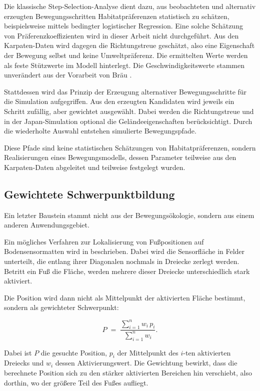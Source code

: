 \documentclass[12pt,a4paper]{report}
\begin{document}
Die klassische Step-Selection-Analyse dient dazu, aus
beobachteten und alternativ erzeugten Bewegungsschritten
Habitatpräferenzen statistisch zu schätzen, beispielsweise
mittels bedingter logistischer Regression. Eine solche
Schätzung von Präferenzkoeffizienten wird in dieser Arbeit
nicht durchgeführt. Aus den Karpaten-Daten wird dagegen die
Richtungstreue geschätzt, also eine Eigenschaft der Bewegung
selbst und keine Umweltpräferenz. Die ermittelten Werte
werden als feste Stützwerte im Modell hinterlegt. Die
Geschwindigkeitswerte stammen unverändert aus der Vorarbeit
von Bräu \cite{BreuBA}.

Stattdessen wird das Prinzip der Erzeugung alternativer
Bewegungsschritte für die Simulation aufgegriffen. Aus den
erzeugten Kandidaten wird jeweils ein Schritt zufällig,
aber gewichtet ausgewählt. Dabei werden die Richtungstreue
und in der Japan-Simulation optional die
Geländeeigenschaften berücksichtigt. Durch die wiederholte
Auswahl entstehen simulierte Bewegungspfade.

Diese Pfade sind keine statistischen Schätzungen von
Habitatpräferenzen, sondern Realisierungen eines
Bewegungsmodells, dessen Parameter teilweise aus den
Karpaten-Daten abgeleitet und teilweise festgelegt wurden.

\subsection{Gewichtete Schwerpunktbildung}
\label{subsec:schwerpunkt}

Ein letzter Baustein stammt nicht aus der Bewegungsökologie, sondern aus einem anderen
Anwendungsgebiet.


Ein mögliches Verfahren zur Lokalisierung von
Fußpositionen auf Bodensensormatten wird in
\cite{GeyerMelzerDuennweber2026} beschrieben.
Dabei wird die Sensorfläche in Felder unterteilt,
die entlang ihrer Diagonalen nochmals in
Dreiecke zerlegt werden. Betritt ein Fuß die
Fläche, werden mehrere dieser Dreiecke
unterschiedlich stark aktiviert.

Die Position wird dann nicht als Mittelpunkt
der aktivierten Fläche bestimmt, sondern als
gewichteter Schwerpunkt:


\begin{equation}
    P \;=\; \frac{\sum_{i=1}^{n} w_{i}\, p_{i}}{\sum_{i=1}^{n} w_{i}} .
    \label{eq:schwerpunkt}
\end{equation}

Dabei ist $P$ die gesuchte Position, $p_{i}$ der Mittelpunkt des $i$-ten aktivierten
Dreiecks und $w_{i}$ dessen Aktivierungswert. Die Gewichtung bewirkt, dass die berechnete
Position sich zu den stärker aktivierten Bereichen hin verschiebt, also dorthin, wo der
größere Teil des Fußes aufliegt.
\end{document}
